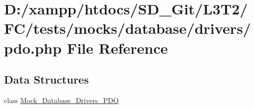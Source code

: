 \hypertarget{pdo_8php}{}\section{D\+:/xampp/htdocs/\+S\+D\+\_\+\+Git/\+L3\+T2/\+F\+C/tests/mocks/database/drivers/pdo.php File Reference}
\label{pdo_8php}
\subsection*{Data Structures}
\begin{DoxyCompactItemize}
\item 
class \hyperlink{class_mock___database___drivers___p_d_o}{Mock\+\_\+\+Database\+\_\+\+Drivers\+\_\+\+P\+D\+O}
\end{DoxyCompactItemize}
